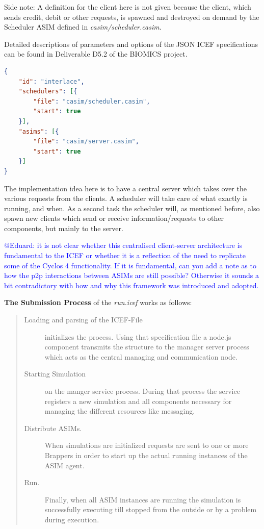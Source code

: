 Side note: A definition for the client here is not given because the client, which sends credit, debit or other requests, is spawned and destroyed on demand by the Scheduler ASIM defined in \textit{casim/scheduler.casim}.

Detailed descriptions of parameters and options of the JSON ICEF specifications can be found in Deliverable D5.2 \cite{BIOMICSD52} of the BIOMICS project.

\begin{center}
\begin{minipage}{0.8\textwidth}
\small
\begin{lstlisting}[language=json,firstnumber=1,caption={\bf\small Example ICEF JSON Specification},captionpos=b,label=lst:icef-json-spec]
{
    "id": "interlace", 
    "schedulers": [{
        "file": "casim/scheduler.casim",
        "start": true
    }], 
    "asims": [{
        "file": "casim/server.casim",
        "start": true
    }]
}
\end{lstlisting}
\end{minipage}
\end{center}

The implementation idea here is to have a central server which takes over the various requests from the clients. A scheduler will take care of what exactly is running, and when. As a second task the scheduler will, as mentioned before, also spawn new clients which send or receive information/requests to other components, but mainly to the server.

\textcolor{blue}{@Eduard: it is not clear whether this centralised client-server architecture is fundamental to the ICEF or whether it is a reflection of the need to replicate some of the Cyclos 4 functionality. If it is fundamental, can you add a note as to how the p2p interactions between ASIMs are still possible? Otherwise it sounds a bit contradictory with how and why this framework was introduced and adopted.}


\textbf{The Submission Process} of the \textit{run.icef} works as follows:

\begin{quote}
\small
\begin{description}
	\item [Loading and parsing of the ICEF-File] initializes the process. Using that specification file a node.js component transmits the structure to the manager server process which acts as the central managing and communication node.
	\item [Starting Simulation] on the manger service process. During that process the service registers a new simulation and all components necessary for managing the different resources like messaging.
	\item [Distribute ASIMs.] When simulations are initialized requests are sent to one or more Brappers in order to start up the actual running instances of the ASIM agent.
	\item [Run.] Finally, when all ASIM instances are running the simulation is successfully executing till stopped from the outside or by a problem during execution.
\end{description}
\end{quote}

